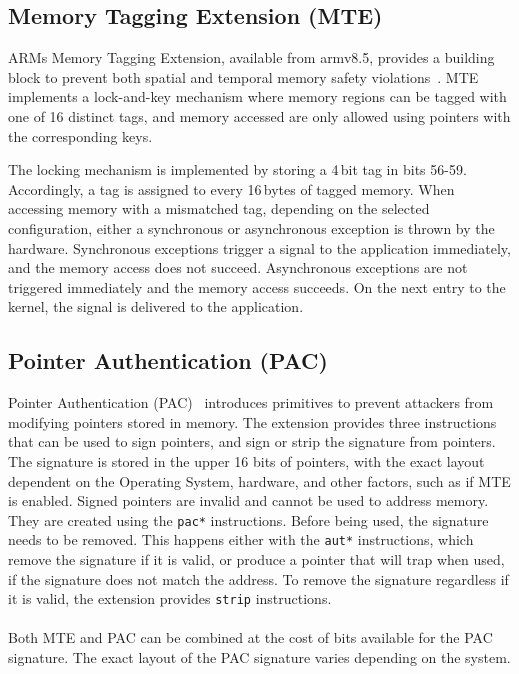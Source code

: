\subsection{Memory Tagging Extension (MTE)}
\label{subsec:mte}

ARMs Memory Tagging Extension, available from armv8.5, provides a building block to prevent both spatial and temporal memory safety violations~\cite{ARM2019MTE}.
MTE implements a lock-and-key mechanism where memory regions can be tagged with one of 16 distinct tags, and memory accessed are only allowed using pointers with the corresponding keys.

The locking mechanism is implemented by storing a 4\,bit tag in bits 56-59.
Accordingly, a tag is assigned to every 16\,bytes of tagged memory.
When accessing memory with a mismatched tag, depending on the selected configuration, either a synchronous or asynchronous exception is thrown by the hardware.
Synchronous exceptions trigger a signal to the application immediately, and the memory access does not succeed.
Asynchronous exceptions are not triggered immediately and the memory access succeeds.
On the next entry to the kernel, the signal is delivered to the application.

\subsection{Pointer Authentication (PAC)}
\label{subsec:pac}

Pointer Authentication (PAC)~\cite{Qualcomm2017PointerAuth} introduces primitives to prevent attackers from modifying pointers stored in memory.
The extension provides three instructions that can be used to sign pointers, and sign or strip the signature from pointers.
The signature is stored in the upper 16 bits of pointers, with the exact layout dependent on the Operating System, hardware, and other factors, such as if MTE is enabled.
Signed pointers are invalid and cannot be used to address memory.
They are created using the \texttt{pac*} instructions.
Before being used, the signature needs to be removed.
This happens either with the \texttt{aut*} instructions, which remove the signature if it is valid, or produce a pointer that will trap when used, if the signature does not match the address.
To remove the signature regardless if it is valid, the extension provides \texttt{strip} instructions.

\paragraph{} Both MTE and PAC can be combined at the cost of bits available for the PAC signature.
The exact layout of the PAC signature varies depending on the system.
